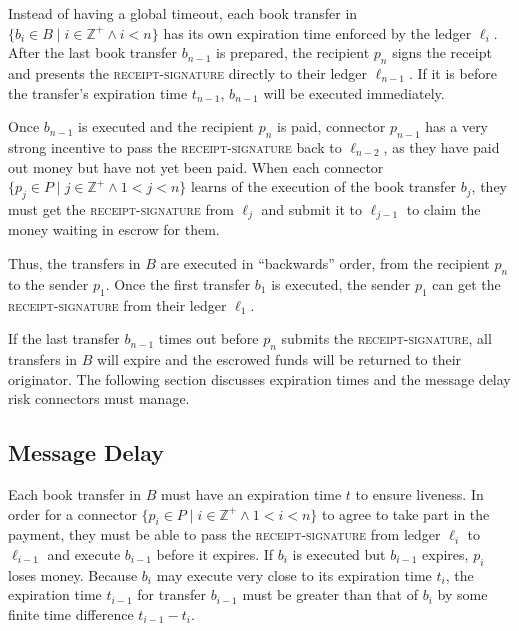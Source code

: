 \documentclass[letterpaper,twocolumn,10pt]{article}
\begin{document}
Instead of having a global timeout, each book transfer in $ \{ b_i \in B \mid i \in \mathbb{Z}^+ \land i < n \} $ has its own expiration time enforced by the ledger $\ell_i$. 
After the last book transfer $b_{n-1}$ is prepared, the recipient $p_n$ signs the receipt and presents the \textsc{receipt-signature} directly to their ledger $\ell_{n-1}$. If it is before the transfer's expiration time $t_{n-1}$, $b_{n-1}$ will be executed immediately.

Once $b_{n-1}$ is executed and the recipient $p_n$ is paid, connector $p_{n-1}$ has a very strong incentive to pass the \textsc{receipt-signature} back to $\ell_{n-2}$, as they have paid out money but have not yet been paid. When each connector $ \{ p_j \in P \mid j \in \mathbb{Z}^+ \land 1 < j < n \} $ learns of the execution of the book transfer $b_j$, they must get the \textsc{receipt-signature} from $\ell_j$ and submit it to $\ell_{j-1}$ to claim the money waiting in escrow for them. 

Thus, the transfers in $B$ are executed in ``backwards'' order, from the recipient $p_n$ to the sender $p_1$. Once the first transfer $b_1$ is executed, the sender $p_1$ can get the \textsc{receipt-signature} from their ledger $\ell_1$.

If the last transfer $b_{n-1}$ times out before $p_n$ submits the \textsc{receipt-signature}, all transfers in $B$ will expire and the escrowed funds will be returned to their originator. The following section discusses expiration times and the message delay risk connectors must manage.


\subsection{Message Delay}
\label{subsec:message-delay}



Each book transfer in $B$ must have an expiration time $t$ to ensure liveness. In order for a connector $ \{ p_i \in P \mid i \in \mathbb{Z}^+ \land 1 < i < n \} $ to agree to take part in the payment, they must be able to pass the \textsc{receipt-signature} from ledger $\ell_i$ to $\ell_{i-1}$ and execute $b_{i-1}$ before it expires. If $b_i$ is executed but $b_{i-1}$ expires, $p_i$ loses money. Because $b_i$ may execute very close to its expiration time $t_i$, the expiration time $t_{i-1}$ for transfer $b_{i-1}$ must be greater than that of $b_i$ by some finite time difference $t_{i-1} - t_i$.
\end{document}
